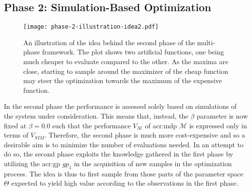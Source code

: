



\newpage

\subsection{Phase 2: Simulation-Based Optimization}
\label{sec:phase-2}

\begin{figure}[t!]
	\centering
	\texttt{[image: phase-2-illustration-idea2.pdf]}
	\caption{An illustration of the idea behind the second phase of the multi-phase framework. The plot shows two artificial functions, one being much cheaper to evaluate compared to the other. As the maxima are close, starting to sample around the maximizer of the cheap function may steer the optimization towards the maximum of the expensive function.}
	\label{fig:phase-2-idea}
\end{figure}

In the second phase the performance is assessed solely based on simulations of the system under consideration.
This means that, instead, the $\beta$ parameter is now fixed at $\beta = 0.0$ such that the performance $V_\mathcal{M}$ of \acrshort{acr:mdp} $\mathcal{M}$ is expressed only in terms of $V_\mathit{SIM}$.
Therefore, the second phase is much more cost-expensive and so a desirable aim is to minimize the number of evaluations needed.
In an attempt to do so, the second phase exploits the knowledge gathered in the first phase by utilizing the \acrshort{acr:gp} $\mathit{gp}_1$ in the acquisition of new samples in the optimization process.
The idea is thus to first sample from those parts of the parameter space $\Theta$ expected to yield high value according to the observations in the first phase.

